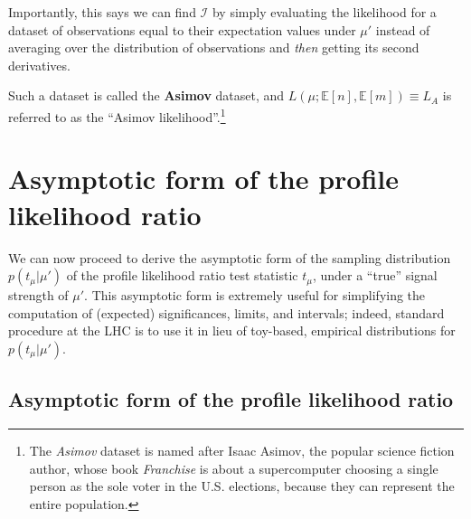 Importantly, this says we can find $\mathcal I$ by simply evaluating the likelihood for a dataset of observations equal to their expectation values under $\mu'$ instead of averaging over the distribution of observations and \textit{then} getting its second derivatives.

\begin{definition}
Such a dataset is called the \textbf{Asimov} dataset, and $L(\mu; \mathbb E[n], \mathbb E[m]) \equiv L_A$ is referred to as the ``Asimov likelihood''.\footnote{The \textit{Asimov} dataset is named after Isaac Asimov, the popular science fiction author, whose book \textit{Franchise} is about a supercomputer choosing a single person as the sole voter in the U.S. elections, because they can represent the entire population.}
\end{definition}



\chapter{Asymptotic form of the profile likelihood ratio}
\label{sec:asymptotic_plr}

We can now proceed to derive the asymptotic form of the sampling distribution $p(t_\mu|\mu')$ of the profile likelihood ratio test statistic $t_\mu$, under a ``true'' signal strength of $\mu'$.
This asymptotic form is extremely useful for simplifying the computation of (expected) significances, limits, and intervals; indeed, standard procedure at the LHC is to use it in lieu of toy-based, empirical distributions for $p(t_\mu|\mu')$.


\section{Asymptotic form of the profile likelihood ratio}

